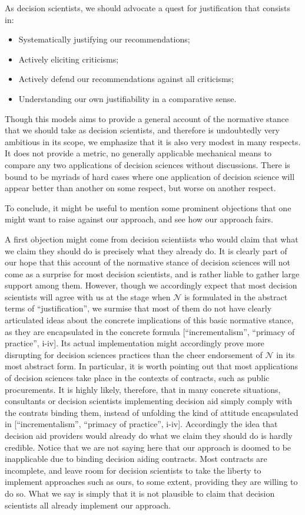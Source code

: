 \documentclass[preprint, french, english, 11pt, authoryear]{elsarticle}%
\newcommand{\adv}{\mathscr{N}}
\begin{document}
As decision scientists, we should advocate a quest for justification that consists in:
\begin{itemize}
	\item Systematically justifying our recommendations;
	\item Actively eliciting criticisms;
	\item Actively defend our recommendations against all criticisms;
	\item Understanding our own justifiability in a comparative sense.
\end{itemize}

Though this models aims to provide a general account of the normative stance that we should take as decision scientists, and therefore is undoubtedly very ambitious in its scope, we emphasize that it is also very modest in many respects. It does not provide a metric, no generally applicable mechanical means to compare any two applications of decision sciences without discussions. There is bound to be myriads of hard cases where one application of decision science will appear better than another on some respect, but worse on another respect.

To conclude, it might be useful to mention some prominent objections that one might want to raise against our approach, and see how our approach fairs.

A first objection might come from decision scientiists who would claim that what we claim they should do is precisely what they already do. It is clearly part of our hope that this account of the normative stance of decision sciences will not come as a surprise for most decision scientists, and is rather liable to gather large support among them. However, though we accordingly expect that most decision scientists will agree with us at the stage when $\adv$ is formulated in the abstract terms of ``justification'', we surmise that most of them do not have clearly articulated ideas about the concrete implications of this basic normative stance, as they are encapsulated in the concrete formula [``incrementalism'', ``primacy of practice'', i-iv]. Its actual implementation might accordingly prove more disrupting for decision sciences practices than the cheer endorsement of $\adv$ in its most abstract form. In particular, it is worth pointing out that most applications of decision sciences take place in the contexts of contracts, such as public procurements. It is highly likely, therefore, that in many concrete situations, consultants or decision scientists implementing decision aid simply comply with the contrats binding them, instead of unfolding the kind of attitude encapsulated in [``incrementalism'', ``primacy of practice'', i-iv]. Accordingly the idea that decision aid providers would already do what we claim they should do is hardly credible. Notice that we are not saying here that our approach is doomed to be inapplicable due to binding decision aiding contracts. Most contracts are incomplete, and leave room for decision scientists to take the liberty to implement approaches such as ours, to some extent, providing they are willing to do so. What we say is simply that it is not plausible to claim that decision scientists all already implement our approach.
\end{document}
